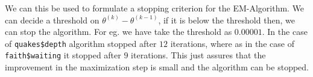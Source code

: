 We can this be used to formulate a stopping criterion for the EM-Algorithm. We can decide a threshold on $\theta^{(k)} - \theta^{(k-1)}$, if it is below the threshold then, we can stop the algorithm. For eg. we have take the threshold as $0.00001$. In the case of \texttt{quakes\$depth} algorithm stopped after $12$ iterations, where as in the case of \texttt{faith\$waiting} it stopped after $9$ iterations.  This just assures that the improvement in the maximization step is small and the algorithm can be stopped.